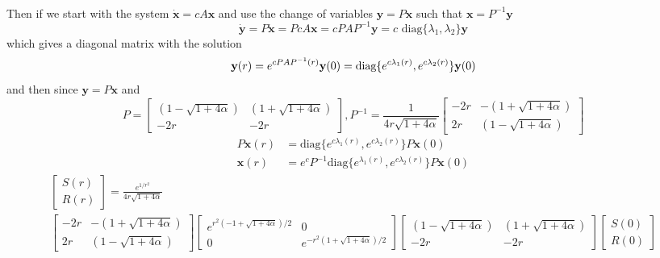\documentclass{article}
\begin{document}
\paragraph{}
Then if we start with the system $\dot{\mathbf{x}} = cA\mathbf{x}$ and use the change of variables $\mathbf{y}=P\mathbf{x}$ such that $\mathbf{x}=P^{-1}\mathbf{y}$ 
\[ \dot{\mathbf{y}} = P\dot{\mathbf{x}} = PcA\mathbf{x} = cPAP^{-1}\mathbf{y} = c\text{ diag}\{ \lambda_{1},\lambda_{2} \} \mathbf{y} \]
which gives a diagonal matrix with the solution
\[ \mathbf{y}(r) = e^{cPAP^{-1}(r)}\mathbf{y}(0) = \text{diag}\{ e^{c\lambda_{1}(r)}, e^{c\lambda_{2}(r)} \}\mathbf{y}(0)\\ \]
and then since $\mathbf{y}=P\mathbf{x}$ and 
\[ 
P = 
\begin{bmatrix}
\left( 1 - \sqrt{1 + 4\alpha} \right)	&	\left( 1 + \sqrt{1 + 4\alpha} \right)	\\
-2r										&	-2r	
\end{bmatrix},
P^{-1} = \frac{1}{ 4r\sqrt{1 + 4\alpha} }
\begin{bmatrix}
-2r	&	-\left( 1 + \sqrt{1 + 4\alpha} \right)	\\
2r	&	\left( 1 - \sqrt{1 + 4\alpha} \right)	
\end{bmatrix}
\]
\begin{align*}
P\mathbf{x}(r) &= \text{diag}\{ e^{c\lambda_{1}(r)}, e^{c\lambda_{2}(r)} \}P\mathbf{x}(0)\\
\mathbf{x}(r) &= e^{c}P^{-1}\text{diag}\{ e^{\lambda_{1}(r)}, e^{c\lambda_{2}(r)} \}P\mathbf{x}(0)
\end{align*}
\begin{multline*}
\begin{bmatrix}
S(r)\\
R(r)
\end{bmatrix}
= \frac{e^{1/r^{2}}}{ 4r\sqrt{1 + 4\alpha} }\\
\begin{bmatrix}
-2r	&	-\left( 1 + \sqrt{1 + 4\alpha} \right)	\\
2r	&	\left( 1 - \sqrt{1 + 4\alpha} \right)	
\end{bmatrix}
\begin{bmatrix}
e^{r^{2}(-1 +\sqrt{1 + 4\alpha})/2}	&	0	\\
0	& e^{-r^{2}(1+\sqrt{1 + 4\alpha})/2}
\end{bmatrix}
\begin{bmatrix}
\left( 1 - \sqrt{1 + 4\alpha} \right)	&	\left( 1 + \sqrt{1 + 4\alpha} \right)	\\
-2r										&	-2r	
\end{bmatrix}
\begin{bmatrix}
S(0)\\
R(0)
\end{bmatrix}
\end{multline*}
\end{document}

